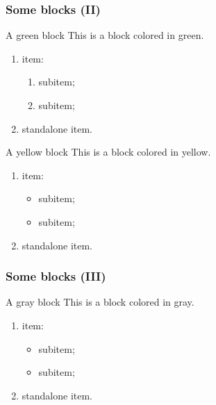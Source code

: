 \begin{frame}
\frametitle{Some blocks (II)}
\begin{exampleblock}{A green block}
This is a block colored in green.

\begin{enumerate}
\item {} item:
\begin{enumerate}
\item {} subitem;
\item {} subitem;
\end{enumerate}
\item {} standalone item.
\end{enumerate}
\end{exampleblock}

\begin{remarkblock}{A yellow block}
This is a block colored in yellow.

\begin{enumerate}
\item {} item:
\begin{itemize}
\item {} subitem;
\item {} subitem;
\end{itemize}
\item {} standalone item.
\end{enumerate}
\end{remarkblock}
\end{frame}

\begin{frame}
\frametitle{Some blocks (III)}
\begin{proofblock}{A gray block}
This is a block colored in gray.

\begin{enumerate}
\item {} item:
\begin{itemize}
\item {} subitem;
\item {} subitem;
\end{itemize}
\item {} standalone item.
\end{enumerate}
\end{proofblock}
\end{frame}
